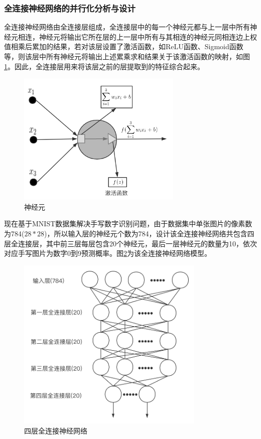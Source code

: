\subsubsection{全连接神经网络的并行化分析与设计}
全连接神经网络由全连接层组成，全连接层中的每一个神经元都与上一层中所有神经元相连，神经元将输出它所在层的上一层中所有与其相连的神经元同相连边上权值相乘后累加的结果，若对该层设置了激活函数，如ReLU函数、Sigmoid函数等，则该层中所有神经元将输出上述累乘求和结果关于该激活函数的映射，如图\ref{fig:neure}。因此，全连接层用来将该层之前的层提取到的特征综合起来。

\begin{figure}[!t]
\centering
\includegraphics[width=0.7\textwidth]{../img/Chap_Application/Yu/neure.png}
\caption{神经元}
\label{fig:neure}
\end{figure}

现在基于MNIST数据集解决手写数字识别问题，由于数据集中单张图片的像素数为784($28\ast28$)，所以输入层的神经元个数为784，设计该全连接神经网络共包含四层全连接层，其中前三层每层包含20个神经元，最后一层神经元的数量为10，依次对应手写图片为数字0到9预测概率。图\ref{fig:dnn}为该全连接神经网络模型。

\begin{figure}[!t]
\centering
\includegraphics[width=0.8\textwidth]{../img/Chap_Application/Yu/dnn.png}
\caption{四层全连接神经网络}
\label{fig:dnn}
\end{figure}

